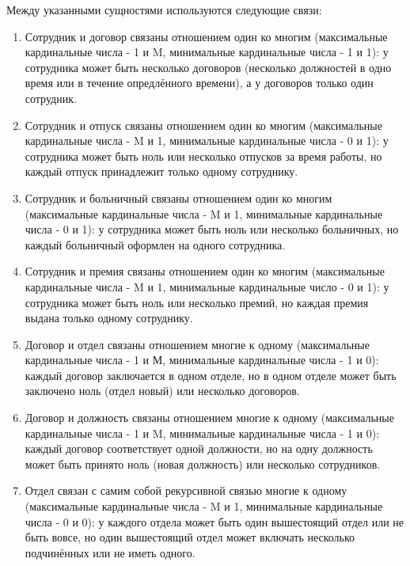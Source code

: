 \documentclass[a4paper, 14pt]{extarticle}
\begin{document}
\newpage
\indent Между указанными сущностями используются следующие связи:
\begin{enumerate}
    \item Сотрудник и договор связаны отношением один ко многим (максимальные кардинальные числа - 1 и M, минимальные кардинальные числа - 1 и 1): у сотрудника может быть несколько договоров (несколько должностей в одно время или в течение опредлённого времени), а у договоров только один сотрудник.
    \vspace{-0.25em}
    \item Сотрудник и отпуск связаны отношением один ко многим (максимальные кардинальные числа - M и 1, минимальные кардинальные числа - 0 и 1): у сотрудника может быть ноль или несколько отпусков за время работы, но каждый отпуск принадлежит только одному сотруднику.
    \vspace{-0.25em}
    \item Сотрудник и больничный связаны отношением один ко многим (максимальные кардинальные числа - M и 1, минимальные кардинальные числа - 0 и 1): у сотрудника может быть ноль или несколько больничных, но каждый больничный оформлен на одного сотрудника.
    \vspace{-0.25em}
    \item Сотрудник и премия связаны отношением один ко многим (максимальные кардинальные числа - M и 1, минимальные кардинальные число - 0 и 1): у сотрудника может быть ноль или несколько премий, но каждая премия выдана только одному сотруднику.
    \vspace{-0.25em}
    \item Договор и отдел связаны отношением многие к одному (максимальные кардинальные числа - 1 и М, минимальные кардинальные числа - 1 и 0): каждый договор заключается в одном отделе, но в одном отделе может быть заключено ноль (отдел новый) или несколько договоров.
    \item Договор и должность связаны отношением многие к одному (максимальные кардинальные числа - 1 и M, минимальные кардинальные числа - 1 и 0): каждый договор соответствует одной должности, но на одну должность может быть принято ноль (новая должность) или несколько сотрудников.
    \vspace{-0.25em}
    \item Отдел связан с самим собой рекурсивной связью многие к одному (максимальные кардинальные числа - M и 1, минимальные кардинальные числа - 0 и 0): у каждого отдела может быть один вышестоящий отдел или не быть вовсе, но один вышестоящий отдел может включать несколько подчинённых или не иметь одного.
\end{enumerate}
\end{document}
